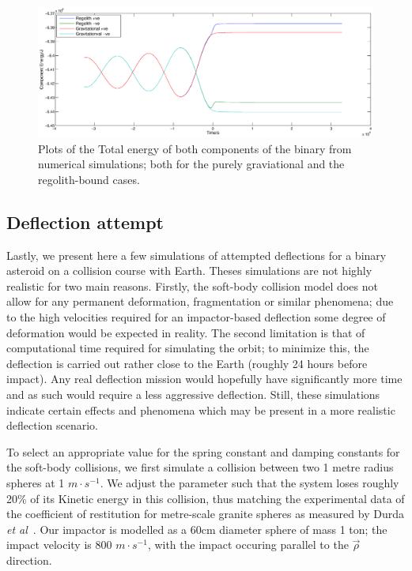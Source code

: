 \documentclass[letterpaper, preprint, paper,11pt]{AAS}	%
\begin{document}
\begin{figure}[H]
\centering
\centerline{\includegraphics[width=1.2\textwidth]{regolith_v_gravitational.eps}} 
\caption{Plots of the Total energy of both components of the binary from numerical simulations; both for the purely graviational and the regolith-bound cases.} 
\label{fig:reg}
\end{figure}

\subsection{Deflection attempt}

Lastly, we present here a few simulations of attempted deflections for a binary asteroid on a collision course with Earth. Theses simulations are not highly realistic for two main reasons. Firstly, the soft-body collision model does not allow for any permanent deformation, fragmentation or similar phenomena; due to the high velocities required for an impactor-based deflection some degree of deformation would be expected in reality. The second limitation is that of computational time required for simulating the orbit; to minimize this, the deflection is carried out rather close to the Earth (roughly 24 hours before impact). Any real deflection mission would hopefully have significantly more time and as such would require a less aggressive deflection. Still, these simulations indicate certain effects and phenomena which may be present in a more realistic deflection scenario. 

To select an appropriate value for the spring constant and damping constants for the soft-body collisions, we first simulate a collision between two 1 metre radius spheres at 1 $m\cdot s^{-1}$. We adjust the parameter such that the system loses roughly 20\% of its Kinetic energy in this collision, thus matching the experimental data of the coefficient of restitution for metre-scale granite spheres as measured by Durda \textit{et al}~\cite{bigrocks}.
Our impactor is modelled as a 60cm diameter sphere of mass 1 ton; the impact velocity is 800 $m\cdot s^{-1}$, with the impact occuring parallel to the $\vec{\rho}$ direction.
\end{document}
